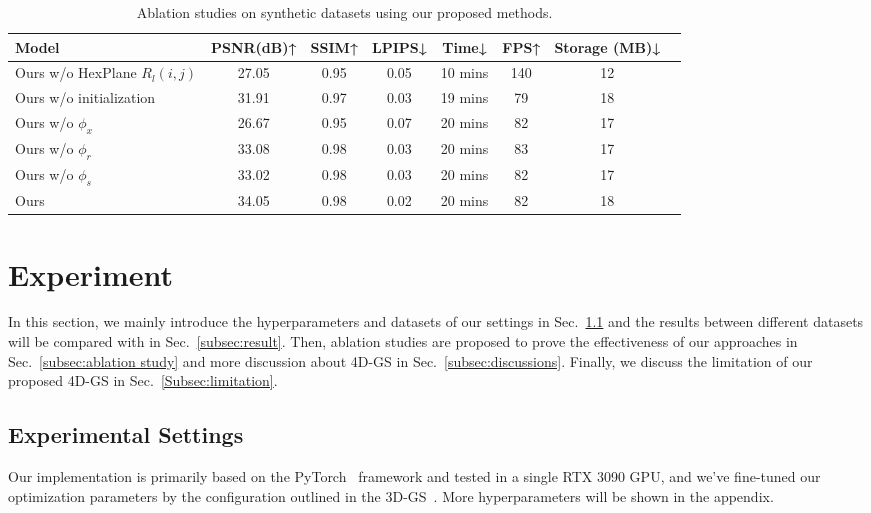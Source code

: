 \begin{table} 
\centering


\caption{Ablation studies on synthetic datasets using our proposed methods.}


\begin{tabular}{l|ccc|c|ccc} 
\toprule
Model  & PSNR(dB)↑ & SSIM↑ & LPIPS↓ & Time↓ &FPS↑& Storage (MB)↓&\\
\midrule 
Ours w/o HexPlane $R_l(i,j)$ & 27.05 & 0.95 & 0.05& \cellcolor{pink}10 mins &\cellcolor{pink}140 &\cellcolor{pink}12 \\ 
Ours w/o initialization  &31.91 & 0.97 & 0.03&\cellcolor{yellow}19 mins& 79&18 \\ 
Ours w/o $\phi_x$ &26.67&0.95&0.07&20 mins&82&17\\
Ours w/o $\phi_r$ &33.08\cellcolor{yellow}&\cellcolor{yellow}0.98&\cellcolor{yellow}0.03&20 mins&83\cellcolor{yellow}&\cellcolor{yellow}17\\
Ours w/o $\phi_s$ &33.02&0.98&0.03&20 mins&82&17\\ 
Ours & \cellcolor{pink}34.05&\cellcolor{pink}0.98 &\cellcolor{pink}0.02&20 mins&82 &18 \\

\bottomrule
\end{tabular}  
\label{table_ab}
\vspace{-10pt}
\end{table}


\section{Experiment}

In this section, we mainly introduce the hyperparameters and datasets of our settings in Sec.~\ref{Experimental Setting} and the results between different datasets will be compared with \cite{tineuvox,msth,wang2023mixedvoxels,lin2023im4d,attal2023hyperreel,hexplane,kplanes,3dgs,song2023nerfplayer} in Sec.~\ref{subsec:result}. Then, ablation studies are proposed to prove the effectiveness of our approaches in Sec.~\ref{subsec:ablation study} and more discussion about 4D-GS in Sec.~\ref{subsec:discussions}. Finally, we discuss the limitation of our proposed 4D-GS in Sec.~\ref{Subsec:limitation}.
\subsection{Experimental Settings}
\label{Experimental Setting}
Our implementation is primarily based on the PyTorch~\cite{pytorch} framework and tested in a single RTX 3090 GPU, and we've fine-tuned our optimization parameters by the configuration outlined in the 3D-GS~\cite{3dgs}. More hyperparameters will be shown in the appendix.

